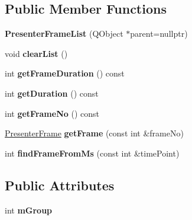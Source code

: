 \subsection*{Public Member Functions}
\begin{DoxyCompactItemize}
\item 
\mbox{\label{class_presenter_frame_list_aa2c74556ed2697a6013956973fda6a17}} 
{\bfseries Presenter\+Frame\+List} (Q\+Object $\ast$parent=nullptr)
\item 
\mbox{\label{class_presenter_frame_list_aa715252ae6dd6bc8dc49aa668eb29748}} 
void {\bfseries clear\+List} ()
\item 
\mbox{\label{class_presenter_frame_list_a6d446834a3e30812912b730f58ebc89e}} 
int {\bfseries get\+Frame\+Duration} () const
\item 
\mbox{\label{class_presenter_frame_list_a830ba7bb76301c3755021b3cf33239ab}} 
int {\bfseries get\+Duration} () const
\item 
\mbox{\label{class_presenter_frame_list_a8c01086322689b3e14c4f28ecdd7b5fd}} 
int {\bfseries get\+Frame\+No} () const
\item 
\mbox{\label{class_presenter_frame_list_a946683cc73234f5c993f5637af5653ff}} 
\mbox{\hyperlink{struct_presenter_frame}{Presenter\+Frame}} {\bfseries get\+Frame} (const int \&frame\+No)
\item 
\mbox{\label{class_presenter_frame_list_a07a924fe311fee3ad0282a95d791e5da}} 
int {\bfseries find\+Frame\+From\+Ms} (const int \&time\+Point)
\end{DoxyCompactItemize}
\subsection*{Public Attributes}
\begin{DoxyCompactItemize}
\item 
\mbox{\label{class_presenter_frame_list_ad58bfd5de0cb2df8070dcc17a8d629cf}} 
int {\bfseries m\+Group}
\end{DoxyCompactItemize}


